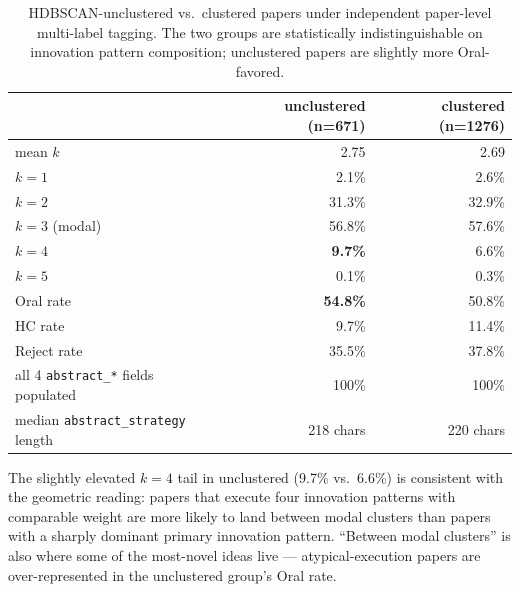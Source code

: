 \documentclass[10pt,a4paper]{article}
\begin{document}
\begin{table}[htbp]
\centering
\caption{HDBSCAN-unclustered vs.\ clustered papers under independent paper-level multi-label tagging. The two groups are statistically indistinguishable on innovation pattern composition; unclustered papers are slightly more Oral-favored.}
\label{tab:unclustered_vs_clustered}
\small
\begin{tabular}{l r r}
\toprule
& unclustered (n=671) & clustered (n=1276) \\
\midrule
mean $k$                                 & 2.75    & 2.69    \\
$k=1$                                    & 2.1\%   & 2.6\%   \\
$k=2$                                    & 31.3\%  & 32.9\%  \\
$k=3$ (modal)                            & 56.8\%  & 57.6\%  \\
$k=4$                                    & \textbf{9.7\%}   & 6.6\%   \\
$k=5$                                    & 0.1\%   & 0.3\%   \\
\midrule
Oral rate                                & \textbf{54.8\%}  & 50.8\%  \\
HC rate                                  & 9.7\%   & 11.4\%  \\
Reject rate                              & 35.5\%  & 37.8\%  \\
\midrule
all 4 \texttt{abstract\_*} fields populated & 100\%   & 100\%   \\
median \texttt{abstract\_strategy} length   & 218 chars & 220 chars \\
\bottomrule
\end{tabular}
\end{table}

The slightly elevated $k{=}4$ tail in unclustered (9.7\% vs.\ 6.6\%) is consistent with the geometric reading: papers that execute four innovation patterns with comparable weight are more likely to land between modal clusters than papers with a sharply dominant primary innovation pattern. ``Between modal clusters'' is also where some of the most-novel ideas live --- atypical-execution papers are over-represented in the unclustered group's Oral rate.
\end{document}
